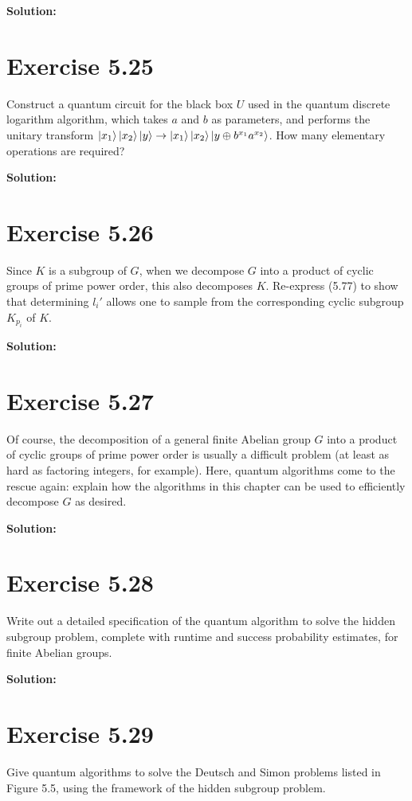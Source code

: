 \documentclass{book}
\begin{document}
    \textbf{Solution:}
    
\section*{Exercise 5.25}
    Construct a quantum circuit for the black box $U$ used in the quantum discrete logarithm algorithm, which takes $a$ and $b$ as parameters, and performs the unitary transform $\ket{x_1}\ket{x_2}\ket{y}\rightarrow\ket{x_1}\ket{x_2}\ket{y\oplus b^{x_1}a^{x_2}}$. How many elementary operations are required?
    
    \textbf{Solution:}
    
\section*{Exercise 5.26}
    Since $K$ is a subgroup of $G$, when we decompose $G$ into a product of cyclic groups of prime power order, this also decomposes $K$. Re-express (5.77) to show that determining $l_i'$ allows one to sample from the corresponding cyclic subgroup $K_{p_i}$ of $K$.
    
    \textbf{Solution:}
    
\section*{Exercise 5.27}
    Of course, the decomposition of a general finite Abelian group $G$ into a product of cyclic groups of prime power order is usually a difficult problem (at least as hard as factoring integers, for example). Here, quantum algorithms come to the rescue again: explain how the algorithms in this chapter can be used to efficiently decompose $G$ as desired.
    
    \textbf{Solution:}

\section*{Exercise 5.28}
    Write out a detailed specification of the quantum algorithm to solve the hidden subgroup problem, complete with runtime and success probability estimates, for finite Abelian groups.
    
    \textbf{Solution:}
    
\section*{Exercise 5.29}
    Give quantum algorithms to solve the Deutsch and Simon problems listed in Figure 5.5, using the framework of the hidden subgroup problem.
    
\end{document}
